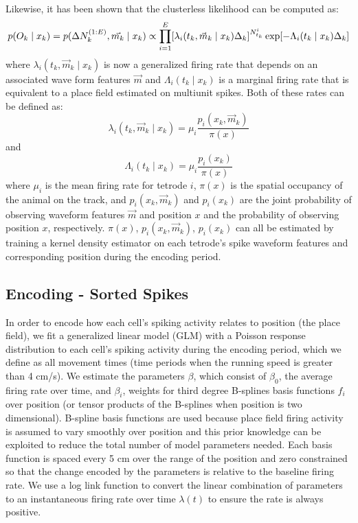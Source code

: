 \documentclass[times, twoside]{zHenriquesLab-StyleBioRxiv}
\begin{document}
Likewise, it has been shown \cite{ChenTransductiveneuraldecoding2012, DengRapidclassificationhippocampal2016, KloostermanBayesiandecodingusing2014} that the clusterless likelihood can be computed as: 
$$
p(O_{k} \mid x_{k}) = p(\Delta N_{k}^{(1:E)}, \vec{m_k} \mid x_{k}) \propto
\prod^{E}_{i=1} [\lambda_{i}(t_{k}, \vec{m}_k \mid x_{k})\Delta_{k}]^{N_{t_{k}}^{i}} \\
    \exp[-\Lambda_{i}(t_{k} \mid x_{k})\Delta_{k}]
$$
where $\lambda_{i}(t_{k}, \vec{m}_k \mid x_{k})$ is now a generalized firing rate that depends on an associated wave form features $\Vec{m}$ and $\Lambda_{i}(t_{k} \mid x_{k})$ is a marginal firing rate that is equivalent to a place field estimated on multiunit spikes. Both of these rates can be defined as:
$$
\lambda_{i}(t_{k}, \vec{m}_k \mid x_{k}) = \mu_i \frac{p_{i}(x_k, \vec{m}_k)}{\pi(x)}
$$
and
$$
\Lambda_{i}(t_{k} \mid x_{k}) = \mu_i \frac{p_{i}(x_k)}{\pi(x)}
$$
where $\mu_i$ is the mean firing rate for tetrode $i$, $\pi(x)$ is the spatial occupancy of the animal on the track, and $p_{i}(x_k, \vec{m}_k)$ and $p_{i}(x_k)$ are the joint probability of observing waveform features $\Vec{m}$ and position $x$ and the probability of observing position $x$, respectively. $\pi(x)$, $p_{i}(x_k, \vec{m}_k)$, $p_{i}(x_k)$ can all be estimated by training a kernel density estimator on each tetrode's spike waveform features and corresponding position during the encoding period.

\subsection*{Encoding - Sorted Spikes}
In order to encode how each cell's spiking activity relates to position (the place field), we fit a generalized linear model (GLM) with a Poisson response distribution to each cell's spiking activity during the encoding period, which we define as all movement times (time periods when the running speed is greater than 4 cm/s). We estimate the parameters $\beta$, which consist of $\beta_{0}$, the average firing rate over time, and $\beta_{i}$, weights for third degree B-splines basis functions $f_{i}$ over position (or tensor products of the B-splines when position is two dimensional). B-spline basis functions are used because place field firing activity is assumed to vary smoothly over position and this prior knowledge can be exploited to reduce the total number of model parameters needed. Each basis function is spaced every 5 cm over the range of the position and zero constrained so that the change encoded by the parameters is relative to the baseline firing rate. We use a log link function to convert the linear combination of parameters to an instantaneous firing rate over time $\lambda(t)$ to ensure the rate is always positive. 
\end{document}
